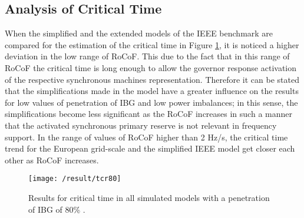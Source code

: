 
\subsection{Analysis of Critical Time}


When the simplified and the extended models of the IEEE benchmark are compared for the estimation of the critical time in Figure \ref{fig:res_tcr}, it is noticed a higher deviation in the low range of RoCoF. This due to the fact that in this range of RoCoF the critical time is long enough to allow the governor response activation of the respective synchronous machines representation. Therefore it can be stated that the simplifications made in the model have a greater influence on the results for low values of penetration of IBG and low power imbalances; in this sense, the simplifications become less significant as the RoCoF increases in such a manner that the activated synchronous primary reserve is not relevant in frequency support. In the range of values of RoCoF higher than 2 Hz/s, the critical time trend for the European grid-scale and the simplified IEEE model get closer each other as RoCoF increases.\\

\begin{figure}[h]
	\centering
	\texttt{[image: /result/tcr80]}
	\caption{Results for critical time in all simulated models with a penetration of IBG of 80\% .}
	\label{fig:res_tcr}
\end{figure}


